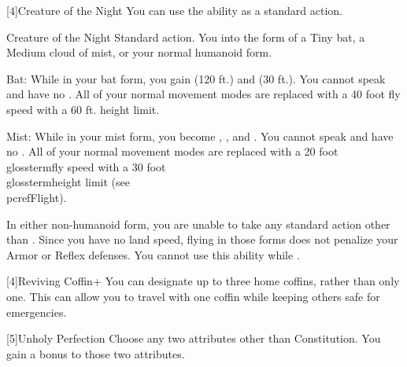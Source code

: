         [4]{Creature of the Night} You can use the  ability as a standard action.
        \begin{magicalattuneability}{Creature of the Night}{}
            \abilityusagetime Standard action.
            \rankline
            You  into the form of a Tiny bat, a Medium cloud of mist, or your normal humanoid form.
            \begin{raggeditemize}
                \item Bat: While in your bat form, you gain  (120 ft.) and  (30 ft.).
                    You cannot speak and have no .
                    All of your normal movement modes are replaced with a 40 foot fly speed with a 60 ft. height limit.
                \item Mist: While in your mist form, you become , , and .
                    You cannot speak and have no .
                    All of your normal movement modes are replaced with a 20 foot \\glossterm{fly speed} with a 30 foot \\glossterm{height limit} (see \\pcref{Flight}).
            \end{raggeditemize}

            In either non-humanoid form, you are unable to take any standard action other than .
            Since you have no land speed, flying in those forms does not penalize your Armor or Reflex defenses.
            You cannot use this ability while \paralyzed.
        \end{magicalattuneability}

        [4]{Reviving Coffin+} You can designate up to three home coffins, rather than only one.
        This can allow you to travel with one coffin while keeping others safe for emergencies.

        [5]{Unholy Perfection} Choose any two attributes other than Constitution.
        You gain a  bonus to those two attributes.

